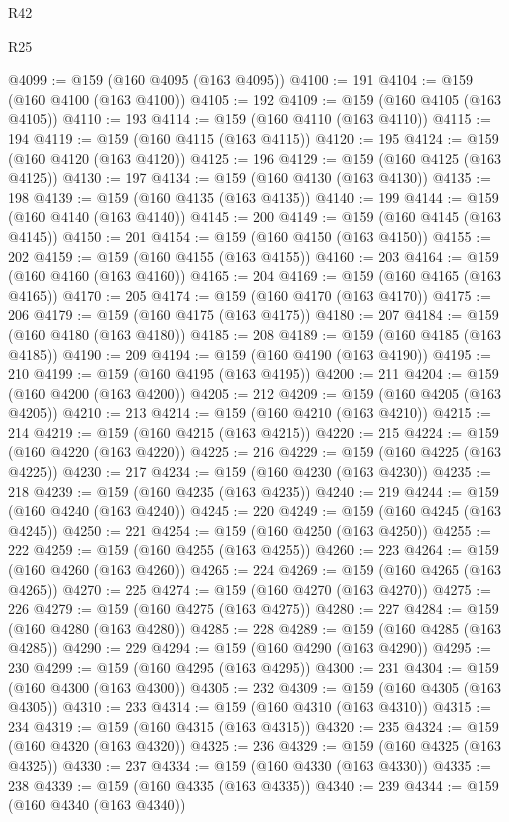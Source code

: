 \begin{lexlean}{R42}
\begin{lexlean}{R25}
\begin{coremodule}
{{{{{{{{{{{{{{{{{{{{{{{{{{{{{{{{{{{{{{{{{{{{{{{{{{{{{{{{{{{{{{{{{{{{{{{{{{{{{{{{{{{{{{{{{{{{{{{{{{{{{{{{{{{{{{{{{{{{{{{{{{{{{{{{{{{{{{{{{{{{{{{{{{{{{{{{{{{{{{{{{{{{{{{{{{{{{{{{{{{{{{{{{{{{{{{{{{{{{{{@4099 := @159 (@160 @4095 (@163 @4095))
@4100 := 191
@4104 := @159 (@160 @4100 (@163 @4100))
@4105 := 192
@4109 := @159 (@160 @4105 (@163 @4105))
@4110 := 193
@4114 := @159 (@160 @4110 (@163 @4110))
@4115 := 194
@4119 := @159 (@160 @4115 (@163 @4115))
@4120 := 195
@4124 := @159 (@160 @4120 (@163 @4120))
@4125 := 196
@4129 := @159 (@160 @4125 (@163 @4125))
@4130 := 197
@4134 := @159 (@160 @4130 (@163 @4130))
@4135 := 198
@4139 := @159 (@160 @4135 (@163 @4135))
@4140 := 199
@4144 := @159 (@160 @4140 (@163 @4140))
@4145 := 200
@4149 := @159 (@160 @4145 (@163 @4145))
@4150 := 201
@4154 := @159 (@160 @4150 (@163 @4150))
@4155 := 202
@4159 := @159 (@160 @4155 (@163 @4155))
@4160 := 203
@4164 := @159 (@160 @4160 (@163 @4160))
@4165 := 204
@4169 := @159 (@160 @4165 (@163 @4165))
@4170 := 205
@4174 := @159 (@160 @4170 (@163 @4170))
@4175 := 206
@4179 := @159 (@160 @4175 (@163 @4175))
@4180 := 207
@4184 := @159 (@160 @4180 (@163 @4180))
@4185 := 208
@4189 := @159 (@160 @4185 (@163 @4185))
@4190 := 209
@4194 := @159 (@160 @4190 (@163 @4190))
@4195 := 210
@4199 := @159 (@160 @4195 (@163 @4195))
@4200 := 211
@4204 := @159 (@160 @4200 (@163 @4200))
@4205 := 212
@4209 := @159 (@160 @4205 (@163 @4205))
@4210 := 213
@4214 := @159 (@160 @4210 (@163 @4210))
@4215 := 214
@4219 := @159 (@160 @4215 (@163 @4215))
@4220 := 215
@4224 := @159 (@160 @4220 (@163 @4220))
@4225 := 216
@4229 := @159 (@160 @4225 (@163 @4225))
@4230 := 217
@4234 := @159 (@160 @4230 (@163 @4230))
@4235 := 218
@4239 := @159 (@160 @4235 (@163 @4235))
@4240 := 219
@4244 := @159 (@160 @4240 (@163 @4240))
@4245 := 220
@4249 := @159 (@160 @4245 (@163 @4245))
@4250 := 221
@4254 := @159 (@160 @4250 (@163 @4250))
@4255 := 222
@4259 := @159 (@160 @4255 (@163 @4255))
@4260 := 223
@4264 := @159 (@160 @4260 (@163 @4260))
@4265 := 224
@4269 := @159 (@160 @4265 (@163 @4265))
@4270 := 225
@4274 := @159 (@160 @4270 (@163 @4270))
@4275 := 226
@4279 := @159 (@160 @4275 (@163 @4275))
@4280 := 227
@4284 := @159 (@160 @4280 (@163 @4280))
@4285 := 228
@4289 := @159 (@160 @4285 (@163 @4285))
@4290 := 229
@4294 := @159 (@160 @4290 (@163 @4290))
@4295 := 230
@4299 := @159 (@160 @4295 (@163 @4295))
@4300 := 231
@4304 := @159 (@160 @4300 (@163 @4300))
@4305 := 232
@4309 := @159 (@160 @4305 (@163 @4305))
@4310 := 233
@4314 := @159 (@160 @4310 (@163 @4310))
@4315 := 234
@4319 := @159 (@160 @4315 (@163 @4315))
@4320 := 235
@4324 := @159 (@160 @4320 (@163 @4320))
@4325 := 236
@4329 := @159 (@160 @4325 (@163 @4325))
@4330 := 237
@4334 := @159 (@160 @4330 (@163 @4330))
@4335 := 238
@4339 := @159 (@160 @4335 (@163 @4335))
@4340 := 239
@4344 := @159 (@160 @4340 (@163 @4340))
}}}}}}}}}}}}}}}}}}}}}}}}}}}}}}}}}}}}}}}}}}}}}}}}}}}}}}}}}}}}}}}}}}}}}}}}}}}}}}}}}}}}}}}}}}}}}}}}}}}}}}}}}}}}}}}}}}}}}}}}}}}}}}}}}}}}}}}}}}}}}}}}}}}}}}}}}}}}}}}}}}}}}}}}}}}}}}}}}}}}}}}}}}}}}}}}}}}}}}}
\end{coremodule}
\end{lexlean}
\end{lexlean}
